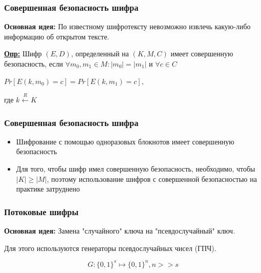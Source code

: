\documentclass{beamer}
\newcommand{\longdef}[1]{{\textbf{\underline{Опр:}} #1}}
\newcommand{\set}[1]{{\lbrace #1 \rbrace}}
\begin{document}
\begin{frame}
  \frametitle{Совершенная безопасность шифра}

  \textbf{Основная идея:} По известному шифротексту невозможно извлечь какую-либо информацию об открытом тексте.
  \vspace{2em}

  \longdef{Шифр $(E,D)$, определенный на $(K,M,C)$ имеет совершенную безопасность, если \newline
    $\forall m_{0},m_{1} \in M:  |m_{0}| = |m_{1}|$ и $\forall c \in C$
      \begin{center} $Pr[E(k,m_{0}) = c] = Pr[E(k,m_{1}) = c]$, \end{center}
      где $k \stackrel{R}{\longleftarrow}K$}


\end{frame}


\begin{frame}
  \frametitle{Совершенная безопасность шифра}

  \begin{itemize}
    \item{Шифрование с помощью одноразовых блокнотов имеет совершенную безопасность}
    \item{Для того, чтобы шифр имел совершенную безопасность, необходимо, чтобы $|K| \ge |M|$, поэтому использование
          шифров с совершенной безопасностью на практике затруднено}
  \end{itemize}
\end{frame}


\begin{frame}
  \frametitle{Потоковые шифры}

  \textbf{Основная идея:} Замена "случайного" ключа на "псевдослучайный" ключ.
  \vspace{1em}

  Для этого используются генераторы псевдослучайных чисел (ГПЧ).
  \vspace{1em}

  \[G:\set{0,1}^{s} \mapsto \set{0,1}^{n}, n>>s\]


\end{frame}
\end{document}
